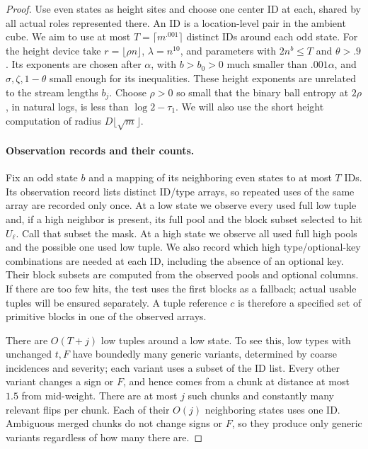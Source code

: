 \begin{proof}
Use even states as height sites and choose one center ID at each, shared
by all actual roles represented there. An ID is a location-level pair in
the ambient cube. We aim to use at most \(T=\lceil m^{.001}\rceil\)
distinct IDs around each odd state. For the height device take
\(r=\lfloor\rho n\rfloor\), \(\lambda=n^{10}\), and parameters with
\(2n^b\le T\) and \(\theta>.9\). Its exponents are chosen after
\(\alpha\), with \(b>b_0>0\) much smaller than \(.001\alpha\), and
\(\sigma,\zeta,1-\theta\) small enough for its inequalities. These
height exponents are unrelated to the stream lengths \(b_j\). Choose
\(\rho>0\) so small that the binary ball entropy at \(2\rho\), in
natural logs, is less than \(\log2-\tau_1\). We will also use the short
height computation of radius \(D\lfloor\sqrt m\rfloor\).

\paragraph{Observation records and their counts.}
Fix an odd state \(b\) and a mapping of its neighboring even states to
at most \(T\) IDs. Its observation record lists distinct ID/type arrays,
so repeated uses of the same array are recorded only once. At a low state
we observe every used full low tuple and, if a high neighbor is present,
its full pool and the block subset selected to hit \(U_\ell\). Call
that subset the mask. At a high state we observe all used full high pools
and the possible one used low tuple. We also record which high
type/optional-key combinations are needed at each ID, including the
absence of an optional key. Their block subsets are computed from the
observed pools and optional columns. If there are too few hits, the test
uses the first blocks as a fallback; actual usable tuples will be ensured
separately. A tuple reference \(c\) is therefore a specified set of
primitive blocks in one of the observed arrays.

There are \(O(T+j)\) low tuples around a low state. To see this, low types
with unchanged \(t,F\) have boundedly many generic variants, determined
by coarse incidences and severity; each variant uses a subset of the ID
list. Every other variant changes a sign or \(F\), and hence comes from
a chunk at distance at most \(1.5\) from mid-weight. There are at most
\(j\) such chunks and constantly many relevant flips per chunk. Each
of their \(O(j)\) neighboring states uses one ID. Ambiguous merged
chunks do not change signs or \(F\), so they produce only generic
variants regardless of how many there are.


\end{proof}
